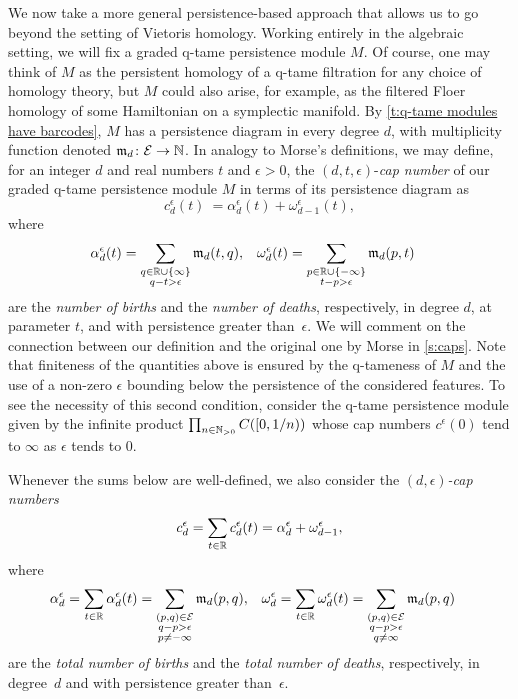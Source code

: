 We now take a more general persistence-based approach that allows us to go beyond the setting of Vietoris homology.
Working entirely in the algebraic setting, we will fix a graded q-tame persistence module $M$.
Of course, one may think of $M$ as the persistent homology of a q-tame filtration for any choice of homology theory, but $M$ could also arise, for example, as the filtered Floer homology of some Hamiltonian on a symplectic manifold.
By \cref{t:q-tame modules have barcodes}, $M$ has a persistence diagram in every degree $d$, with multiplicity function denoted $\mathfrak{m}_d \colon \mathcal{E} \to \mathbb{N}$.
In analogy to Morse's definitions, we may define, for an integer $d$ and real numbers $t$ and $\epsilon > 0$, the $(d, t, \epsilon)$-\emph{cap number} of our graded q-tame persistence module $M$ in terms of its persistence diagram as
\begin{equation*}
c_{d}^{\epsilon}(t) \ =
\alpha_{d}^{\epsilon}(t) + \omega_{d-1}^{\epsilon}(t),
\end{equation*}
where
\begin{align*}
\alpha_{d}^{\epsilon}(t) &= \sum_{\substack{q \in \mathbb{R} \cup \{\infty\} \\ q - t > \epsilon}} \mathfrak{m}_d(t, q),
&
\omega_{d}^{\epsilon}(t) &= \sum_{\substack{p \in \mathbb{R} \cup \{-\infty\} \\ t - p > \epsilon}} \mathfrak{m}_{d}(p, t)
\end{align*}
are the \emph{number of births} and the \emph{number of deaths}, respectively, in degree $d$, at parameter $t$, and with persistence greater than~$\epsilon$.
We will comment on the connection between our definition and the original one by Morse in \cref{s:caps}.
Note that finiteness of the quantities above is ensured by the q-tameness of $M$ and the use of a non-zero $\epsilon$ bounding below the persistence of the considered features.
To see the necessity of this second condition, consider the q-tame persistence module given by the infinite product $\prod_{n \in \mathbb{N}_{> 0}} C([0,1/n))$ whose cap numbers $c^{\epsilon}(0)$ tend to $\infty$ as $\epsilon$ tends to 0.

Whenever the sums below are well-defined, we also consider the \emph{$(d,\epsilon)$-cap numbers}
\[
c_{d}^{\epsilon} = \sum_{t \in \mathbb{R}} c_{d}^{\epsilon}(t) = \alpha_{d}^{\epsilon} + \omega_{d-1}^{\epsilon},
\]
where
\begin{align*}
\alpha_{d}^{\epsilon} &= \sum_{t \in \mathbb{R}} \alpha_{d}^{\epsilon}(t) = \sum_{\substack{(p,q) \in \mathcal{E} \\ q - p > \epsilon \\ p \neq -\infty}}\mathfrak{m}_d(p,q),
&
\omega_{d}^{\epsilon} &= \sum_{t \in \mathbb{R}} \omega_{d}^{\epsilon}(t) = \sum_{\substack{(p,q) \in \mathcal{E} \\ q - p > \epsilon \\ q \neq \infty}} \mathfrak{m}_{d}(p,q)
\end{align*}
are the \emph{total number of births} and the \emph{total number of deaths}, respectively, in degree~$d$ and with persistence greater than~$\epsilon$.

